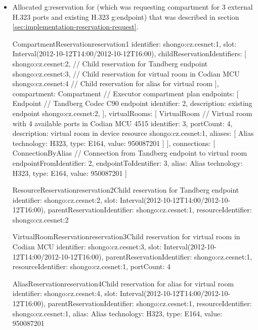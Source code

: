 \begin{itemize}
\item Allocated \gls{g:reservation} for \hyperref[oc:request1]{} (which was requesting compartment for 3 external H.323 ports and existing H.323 \gls{g:endpoint}) that was described in section \ref{sec:implementation-reservation-request}.
\begin{ObjectCode}{CompartmentReservation}{reservation1}{}
identifier: shongo:cz.cesnet:1,
slot: Interval(2012-10-12T14:00/2012-10-12T16:00),
childReservationIdentifiers: [
  shongo:cz.cesnet:2, // Child reservation for Tandberg endpoint 
  shongo:cz.cesnet:3, // Child reservation for virtual room in Codian MCU
  shongo:cz.cesnet:4  // Child reservation for alias for virtual room
],
compartment: Compartment { // Executor compartment plan
  endpoints: [
    Endpoint { // Tandberg Codec C90 endpoint
      identifier: 2,
      description: existing endpoint shongo:cz.cesnet:2,      
    }
  ],
  virtualRooms: [
    VirtualRoom { // Virtual room with 4 available ports in Codian MCU 4515
      identifier: 3,
      portCount: 4,
      description: virtual room in device resource shongo:cz.cesnet:1,      
      aliases: [
        Alias { technology: H323, type: E164, value: 950087201 }
      ]
    }
  ],
  connections: [
    ConnectionByAlias { // Connection from Tandberg endpoint to virtual room
      endpointFromIdentifier: 2, 
      endpointToIdentifier: 3,
      alias: Alias { technology: H323, type: E164, value: 950087201 }
    }
  ]
}
\end{ObjectCode}
\begin{ObjectCode}{ResourceReservation}{reservation2}{Child reservation for Tandberg endpoint}
identifier: shongo:cz.cesnet:2,
slot: Interval(2012-10-12T14:00/2012-10-12T16:00),
parentReservationIdentifier: shongo:cz.cesnet:1,
resourceIdentifier: shongo:cz.cesnet:2
\end{ObjectCode}
\begin{ObjectCode}{VirtualRoomReservation}{reservation3}{Child reservation for virtual room in Codian MCU}
identifier: shongo:cz.cesnet:3,
slot: Interval(2012-10-12T14:00/2012-10-12T16:00),
parentReservationIdentifier: shongo:cz.cesnet:1,
resourceIdentifier: shongo:cz.cesnet:1,
portCount: 4
\end{ObjectCode}
\begin{ObjectCode}{AliasReservation}{reservation4}{Child reservation for alias for virtual room}
identifier: shongo:cz.cesnet:4,
slot: Interval(2012-10-12T14:00/2012-10-12T16:00),
parentReservationIdentifier: shongo:cz.cesnet:1,
resourceIdentifier: shongo:cz.cesnet:1,
alias: Alias { technology: H323, type: E164, value: 950087201 }
\end{ObjectCode}


\end{itemize}
